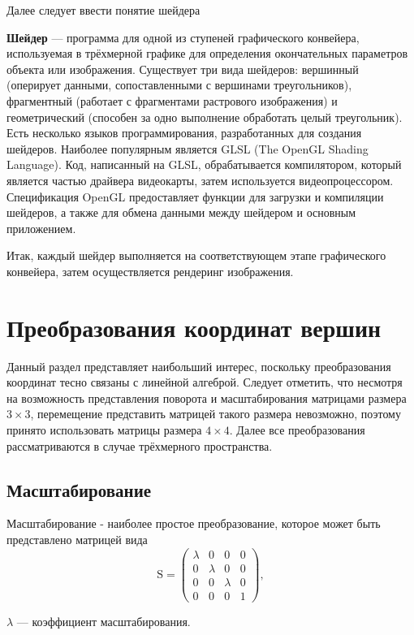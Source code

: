 Далее следует ввести понятие шейдера

\textbf{Шейдер} --- программа для одной из ступеней графического конвейера, используемая в трёхмерной графике 
для определения окончательных параметров объекта или изображения.
Существует три вида шейдеров: вершинный (оперирует данными, сопоставленными с вершинами треугольников), 
фрагментный (работает с фрагментами растрового изображения) и геометрический (способен за одно выполнение 
обработать целый треугольник). Есть несколько языков программирования, разработанных для создания шейдеров. 
Наиболее популярным является GLSL (The OpenGL Shading Language). Код, написанный на GLSL, обрабатывается компилятором, 
который является частью драйвера видеокарты, затем используется видеопроцессором. Спецификация OpenGL предоставляет 
функции для загрузки и компиляции шейдеров, а также для обмена данными между шейдером и основным приложением.

Итак, каждый шейдер выполняется на соответствующем этапе графического конвейера, затем осуществляется рендеринг изображения.

\section{Преобразования координат вершин}
Данный раздел представляет наибольший интерес, поскольку преобразования координат тесно связаны с линейной алгеброй. 
Следует отметить, что несмотря на возможность представления поворота и масштабирования матрицами размера \begin{math}3\times3\end{math}, 
перемещение представить матрицей такого размера невозможно, поэтому принято использовать матрицы размера \begin{math}4\times4\end{math}. 
Далее все преобразования рассматриваются в случае трёхмерного пространства.
\subsection{Масштабирование}
Масштабирование - наиболее простое преобразование, которое может быть представлено матрицей вида
\begin{equation}
\mathrm{S} = 
  \begin{pmatrix}
    \lambda & 0 & 0 & 0 \\
    0 & \lambda & 0 & 0 \\
    0 & 0 & \lambda & 0 \\
    0 & 0 & 0 & 1
  \end{pmatrix},
\end{equation}
\begin{eqrem}
\begin{math} \lambda \end{math} --- коэффициент масштабирования.
\end{eqrem}

